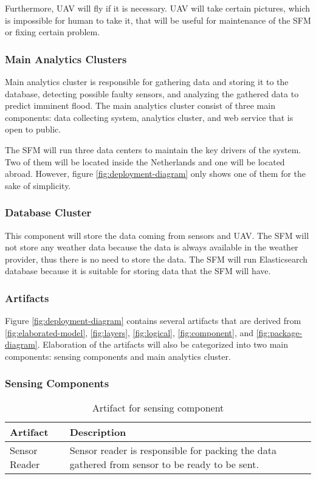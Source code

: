 Furthermore, \gls{UAV} will fly if it is necessary. \gls{UAV} will take certain pictures, which is impossible for human to take it, that will be useful for maintenance of the \gls{SFM} or fixing certain problem.

\subsubsection*{Main Analytics Clusters}
Main analytics cluster is responsible for gathering data and storing it to the database, detecting possible faulty sensors, and analyzing the gathered data to predict imminent flood. The main analytics cluster consist of three main components: data collecting system, analytics cluster, and web service that is open to public.

The \gls{SFM} will run three data centers to maintain the key drivers of the system. Two of them will be located inside the Netherlands and one will be located abroad. However, figure \ref{fig:deployment-diagram} only shows one of them for the sake of simplicity.

\subsubsection*{Database Cluster}
This component will store the data coming from sensors and \gls{UAV}. The \gls{SFM} will not store any weather data because the data is always available in the weather provider, thus there is no need to store the data. The \gls{SFM} will run Elasticsearch database because it is suitable for storing data that the \gls{SFM} will have.

\subsubsection{Artifacts}
Figure \ref{fig:deployment-diagram} contains several artifacts that are derived from \autoref{fig:elaborated-model}, \autoref{fig:layers}, \autoref{fig:logical}, \autoref{fig:component}, and \autoref{fig:package-diagram}. Elaboration of the artifacts will also be categorized into two main components: sensing components and main analytics cluster.

\subsubsection*{Sensing Components}
\begin{table}[h!]
\begin{tabular}{L{0.2\textwidth} L{0.6\textwidth}}
    \textbf{Artifact} 		& \textbf{Description} \\ \toprule
    Sensor Reader	 		& Sensor reader is responsible for packing the data gathered from sensor to be ready to be sent.\\ \bottomrule
\end{tabular}
\caption{Artifact for sensing component}
\label{table:sensing-artifacts}
\end{table}

